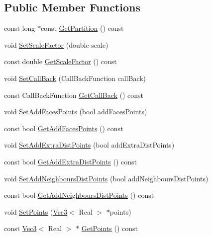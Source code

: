 \subsection*{Public Member Functions}
\begin{DoxyCompactItemize}
\item 
const long $\ast$const \hyperlink{class_h_a_c_d_1_1_h_a_c_d_a9b9ea873c8a256661e1d18c8e3786357}{Get\+Partition} () const 
\item 
void \hyperlink{class_h_a_c_d_1_1_h_a_c_d_adbf1ee70b86737fd7e4e7f25b901c0fd}{Set\+Scale\+Factor} (double scale)
\item 
const double \hyperlink{class_h_a_c_d_1_1_h_a_c_d_aef9fcb622463db71c57a8549a2c055c0}{Get\+Scale\+Factor} () const 
\item 
void \hyperlink{class_h_a_c_d_1_1_h_a_c_d_abadb9c8fbdae132d3324dbe9436b80aa}{Set\+Call\+Back} (Call\+Back\+Function call\+Back)
\item 
const Call\+Back\+Function \hyperlink{class_h_a_c_d_1_1_h_a_c_d_a50493a948481168d6ca825aa31b90326}{Get\+Call\+Back} () const 
\item 
void \hyperlink{class_h_a_c_d_1_1_h_a_c_d_a6db85aa35a4a67b4051f38fbc827ef81}{Set\+Add\+Faces\+Points} (bool add\+Faces\+Points)
\item 
const bool \hyperlink{class_h_a_c_d_1_1_h_a_c_d_af7f766c8f064eff4e6bdc58fc6cf49a9}{Get\+Add\+Faces\+Points} () const 
\item 
void \hyperlink{class_h_a_c_d_1_1_h_a_c_d_af6611e7dea03a69af44140d071c1bbb1}{Set\+Add\+Extra\+Dist\+Points} (bool add\+Extra\+Dist\+Points)
\item 
const bool \hyperlink{class_h_a_c_d_1_1_h_a_c_d_a4e3a56a9808ac0146b473ccbf82bc4d7}{Get\+Add\+Extra\+Dist\+Points} () const 
\item 
void \hyperlink{class_h_a_c_d_1_1_h_a_c_d_a5b300a3914c270d7265515e99122a66b}{Set\+Add\+Neighbours\+Dist\+Points} (bool add\+Neighbours\+Dist\+Points)
\item 
const bool \hyperlink{class_h_a_c_d_1_1_h_a_c_d_a3356651bf4f7c445dfe4c6217609f44c}{Get\+Add\+Neighbours\+Dist\+Points} () const 
\item 
void \hyperlink{class_h_a_c_d_1_1_h_a_c_d_a0132180ef051b26ee0fb930069c8aac1}{Set\+Points} (\hyperlink{class_h_a_c_d_1_1_vec3}{Vec3}$<$ Real $>$ $\ast$points)
\item 
const \hyperlink{class_h_a_c_d_1_1_vec3}{Vec3}$<$ Real $>$ $\ast$ \hyperlink{class_h_a_c_d_1_1_h_a_c_d_a676abd8410ef3b4677119cd36be3248c}{Get\+Points} () const 
\item 

\end{DoxyCompactItemize}

